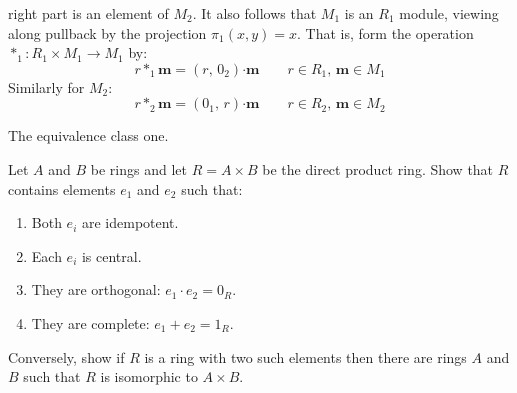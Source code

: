 \documentclass[crop=false,class=article]{standalone}                           %
\begin{document}
\begin{solution}
            right part is an element of $M_{2}$. It also follows that
            $M_{1}$ is an $R_{1}$ module, viewing along pullback by the
            projection $\pi_{1}(x,y)=x$. That is, form the operation
            $*_{1}:R_{1}\times{M}_{1}\rightarrow{M}_{1}$ by:
            \begin{equation}
                r*_{1}\mathbf{m}=(r,\,0_{2})\boldsymbol{\cdot}\mathbf{m}
                \quad\quad
                r\in{R}_{1},\,\mathbf{m}\in{M}_{1}
            \end{equation}
            Similarly for $M_{2}$:
            \begin{equation}
                r*_{2}\mathbf{m}=(0_{1},\,r)\boldsymbol{\cdot}\mathbf{m}
                \quad\quad
                r\in{R}_{2},\,\mathbf{m}\in{M}_{2}
            \end{equation}
        \end{solution}
        \begin{problem}
            The equivalence class one.
        \end{problem}
        \begin{problem}
            Let $A$ and $B$ be rings and let $R=A\times{B}$ be the
            direct product ring. Show that $R$ contains elements $e_{1}$
            and $e_{2}$ such that:
            \begin{enumerate}
                \item Both $e_{i}$ are idempotent.
                \item Each $e_{i}$ is central.
                \item They are orthogonal: $e_{1}\cdot{e}_{2}=0_{R}$.
                \item They are complete: $e_{1}+e_{2}=1_{R}$.
            \end{enumerate}
            Conversely, show if $R$ is a ring with two such elements then
            there are rings $A$ and $B$ such that $R$ is isomorphic to
            $A\times{B}$.
        \end{problem}
\end{document}
